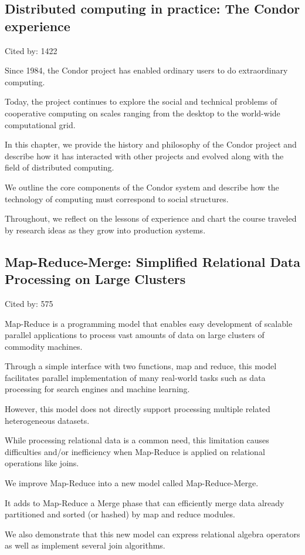 \documentclass[a4paper,11pt]{article}
\begin{document}
\subsection*{Distributed computing in practice: The Condor experience}
{\color{cyan} {\color{magenta} Cited by: 1422}

Since 1984, 
the Condor project has enabled ordinary users to do extraordinary computing. 

Today, 
the project continues to explore the social and technical problems of 
cooperative computing on scales ranging from the desktop to the world-wide computational grid. 

In this chapter, we 
provide the history and philosophy of the {\color{black} Condor project\cite{condor}} and 
describe how it has interacted with other projects and evolved along with the ﬁeld of distributed computing. 

We 
outline the core components of the Condor system and 
describe how the technology of computing must correspond to social structures.

Throughout, we 
reﬂect on the lessons of experience and 
chart the course traveled by research ideas as they grow into production systems.

}

\subsection*{Map-Reduce-Merge: Simplified Relational Data Processing on Large Clusters}
{\color{cyan} {\color{magenta} Cited by: 575}

Map-Reduce is a programming model 
that enables easy development of scalable parallel applications 
to process vast amounts of data on large clusters of commodity machines.

Through a simple interface with two functions, map and reduce,
this model facilitates parallel implementation of many real-world tasks such as 
data processing for search engines and machine learning.

However, 
this model does not directly support processing multiple related heterogeneous datasets. 

While processing relational data is a common need, this limitation causes difficulties
and/or inefficiency when Map-Reduce is applied on relational operations like joins.

We improve 
Map-Reduce into a new model called 
{\color{black} Map-Reduce-Merge\cite{mapredmerge}}. 

It adds to Map-Reduce a Merge phase that can efficiently merge data already partitioned and sorted (or
hashed) by map and reduce modules. 

We also demonstrate that 
this new model can express relational algebra operators
as well as implement several join algorithms.

}
\end{document}
